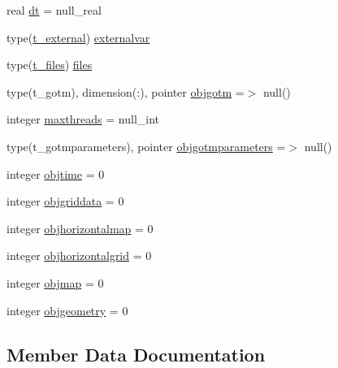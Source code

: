 \begin{DoxyCompactItemize}
\item 
real \mbox{\hyperlink{structmoduleturbgotm_1_1t__turbgotm_ad845e85ba1c712f48e287e3edfd9fd9c}{dt}} = null\+\_\+real
\item 
type(\mbox{\hyperlink{structmoduleturbgotm_1_1t__external}{t\+\_\+external}}) \mbox{\hyperlink{structmoduleturbgotm_1_1t__turbgotm_ae4b2497dbf97f24137824988ab34090c}{externalvar}}
\item 
type(\mbox{\hyperlink{structmoduleturbgotm_1_1t__files}{t\+\_\+files}}) \mbox{\hyperlink{structmoduleturbgotm_1_1t__turbgotm_a285be44f7959684c4436afa761e6efe9}{files}}
\item 
type(t\+\_\+gotm), dimension(\+:), pointer \mbox{\hyperlink{structmoduleturbgotm_1_1t__turbgotm_aac972434e3c634202405ca7fc6df756b}{objgotm}} =$>$ null()
\item 
integer \mbox{\hyperlink{structmoduleturbgotm_1_1t__turbgotm_ae1aaeec5059c3af7050fd8ea62b9e759}{maxthreads}} = null\+\_\+int
\item 
type(t\+\_\+gotmparameters), pointer \mbox{\hyperlink{structmoduleturbgotm_1_1t__turbgotm_a978df6481ead2347503e5eb07c55d258}{objgotmparameters}} =$>$ null()
\item 
integer \mbox{\hyperlink{structmoduleturbgotm_1_1t__turbgotm_a086db531b5db3fe7c6340845cb19ebaf}{objtime}} = 0
\item 
integer \mbox{\hyperlink{structmoduleturbgotm_1_1t__turbgotm_a51e87bdd152824c9fd26a15765e3d6f0}{objgriddata}} = 0
\item 
integer \mbox{\hyperlink{structmoduleturbgotm_1_1t__turbgotm_a14d5905f62a8a04f1367d70d4d338631}{objhorizontalmap}} = 0
\item 
integer \mbox{\hyperlink{structmoduleturbgotm_1_1t__turbgotm_a417af34e17982a190caf069d6ed70927}{objhorizontalgrid}} = 0
\item 
integer \mbox{\hyperlink{structmoduleturbgotm_1_1t__turbgotm_ace0b2547515b0286b759c9c153496c69}{objmap}} = 0
\item 
integer \mbox{\hyperlink{structmoduleturbgotm_1_1t__turbgotm_a026a546d01bd4145909150c7115ce92e}{objgeometry}} = 0
\end{DoxyCompactItemize}


\subsection{Member Data Documentation}
\mbox{\label{structmoduleturbgotm_1_1t__turbgotm_aa2143a10fa14294021526aff3a052e7d}} 
